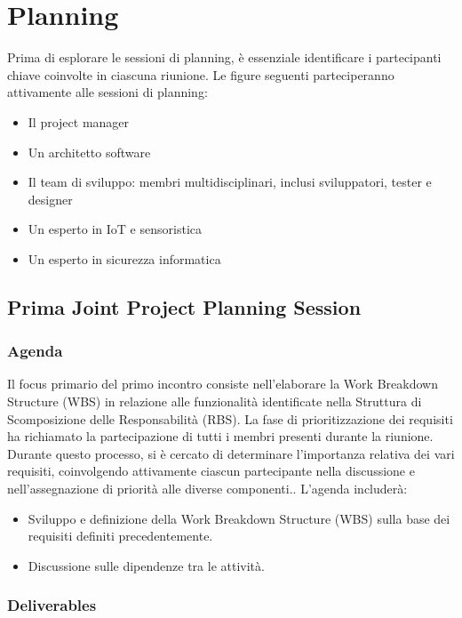 \chapter{Planning}

Prima di esplorare le sessioni di planning, è essenziale identificare i partecipanti chiave coinvolte in ciascuna riunione. Le figure seguenti parteciperanno attivamente alle sessioni di planning:

\begin{itemize}
    \item Il project manager
    \item Un architetto software
    \item Il team di sviluppo: membri multidisciplinari, inclusi sviluppatori, tester e designer
    \item Un esperto in IoT e sensoristica
    \item Un esperto in sicurezza informatica
\end{itemize}

\section{Prima Joint Project Planning Session}

\subsection{Agenda}

Il focus primario del primo incontro consiste nell'elaborare la Work Breakdown Structure (WBS) in relazione alle funzionalità identificate nella Struttura di Scomposizione delle Responsabilità (RBS). La fase di prioritizzazione dei requisiti ha richiamato la partecipazione di tutti i membri presenti durante la riunione. Durante questo processo, si è cercato di determinare l'importanza relativa dei vari requisiti, coinvolgendo attivamente ciascun partecipante nella discussione e nell'assegnazione di priorità alle diverse componenti.. L'agenda includerà:

\begin{itemize}
    \item Sviluppo e definizione della Work Breakdown Structure (WBS) sulla base dei requisiti definiti precedentemente.
    \item Discussione sulle dipendenze tra le attività.
\end{itemize}

\subsection{Deliverables}

